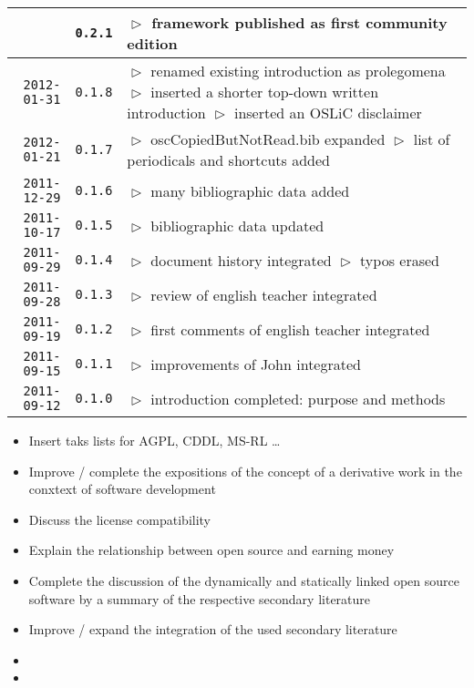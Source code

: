 \begin{table}
\begin{center}
\begin{tabular}{|r|c|p{10cm}|}
  & \texttt{0.2.1} 
  & $\vartriangleright$ framework published as first community edition\\
\hline
    \texttt{2012-01-31}
  & \texttt{0.1.8} 
  & $\vartriangleright$ renamed existing introduction as prolegomena\newline
    $\vartriangleright$ inserted a shorter top-down written introduction\newline
    $\vartriangleright$ inserted an OSLiC disclaimer\\
\hline
    \texttt{2012-01-21}
  & \texttt{0.1.7} 
  & $\vartriangleright$ oscCopiedButNotRead.bib expanded\newline 
  $\vartriangleright$ list of periodicals and shortcuts added\\
\hline
    \texttt{2011-12-29}
  & \texttt{0.1.6} 
  & $\vartriangleright$ many bibliographic data added\\
\hline
    \texttt{2011-10-17}
  & \texttt{0.1.5} 
  & $\vartriangleright$ bibliographic data updated\\
\hline
    \texttt{2011-09-29}
  & \texttt{0.1.4} 
  & $\vartriangleright$ document history integrated\newline
    $\vartriangleright$ typos erased\\
\hline
    \texttt{2011-09-28}
  & \texttt{0.1.3} 
  & $\vartriangleright$ review of english teacher integrated \\
\hline
    \texttt{2011-09-19}
  & \texttt{0.1.2} 
  & $\vartriangleright$ first comments of english teacher integrated \\
\hline
    \texttt{2011-09-15}
  & \texttt{0.1.1} 
  & $\vartriangleright$ improvements of John integrated\\
\hline
    \texttt{2011-09-12}
  & \texttt{0.1.0} 
  & $\vartriangleright$ introduction completed: purpose and methods \\
\hline
\hline 
\end{tabular}
\end{center}
\end{table}

\begin{footnotesize}
\begin{itemize}
  \item Insert taks lists for AGPL, CDDL, MS-RL \ldots
  \item Improve / complete the expositions of the concept of a derivative work
  in the conxtext of software development
  \item Discuss the license compatibility
  \item Explain the relationship between open source and earning money
  \item Complete the discussion of the dynamically and statically linked open
  source software by a summary of the respective secondary literature
  \item Improve / expand the integration of the used secondary literature
  \item 
  \item 
\end{itemize}
\end{footnotesize}

%
